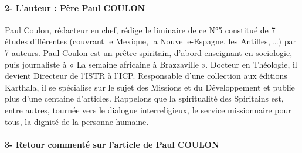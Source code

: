 \paragraph{2- L’auteur : Père Paul COULON}

Paul Coulon, rédacteur en chef, rédige le liminaire de ce N°5 constitué de 7 études différentes (couvrant le Mexique, la Nouvelle-Espagne, les Antilles, …) par 7 auteurs. Paul Coulon est un prêtre spiritain, d’abord enseignant en sociologie, puis journaliste à « La semaine africaine à Brazzaville ». Docteur en Théologie, il devient Directeur de l’ISTR à l’ICP. Responsable d’une collection aux éditions Karthala, il se spécialise sur le sujet des Missions et du Développement et publie plus d’une centaine d’articles.  Rappelons que la spiritualité des Spiritains est, entre autres, tournée vers le dialogue interreligieux, le service missionnaire pour tous, la dignité de la personne humaine. 


\paragraph{3- Retour commenté sur l’article de Paul COULON }

